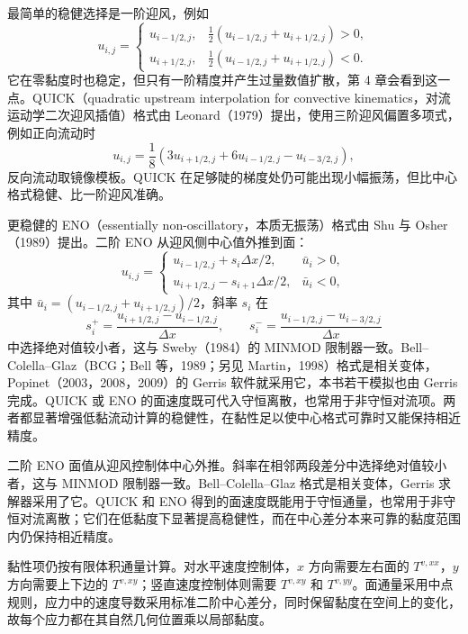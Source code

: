 \documentclass[11pt,a4paper,openany,fontset=none]{ctexbook}
\begin{document}
最简单的稳健选择是一阶迎风，例如
\begin{equation}
 u_{i,j}=\begin{cases}
 u_{i-1/2,j},&\tfrac12(u_{i-1/2,j}+u_{i+1/2,j})>0,\\
 u_{i+1/2,j},&\tfrac12(u_{i-1/2,j}+u_{i+1/2,j})<0.
 \end{cases} \tag{3.34}
\end{equation}
它在零黏度时也稳定，但只有一阶精度并产生过量数值扩散，第 4 章会看到这一点。QUICK（quadratic upstream interpolation for convective kinematics，对流运动学二次迎风插值）格式由 Leonard（1979）提出，使用三阶迎风偏置多项式，例如正向流动时
\begin{equation}
 u_{i,j}=\frac18(3u_{i+1/2,j}+6u_{i-1/2,j}-u_{i-3/2,j}), \tag{3.35}
\end{equation}
反向流动取镜像模板。QUICK 在足够陡的梯度处仍可能出现小幅振荡，但比中心格式稳健、比一阶迎风准确。

更稳健的 ENO（essentially non-oscillatory，本质无振荡）格式由 Shu 与 Osher（1989）提出。二阶 ENO 从迎风侧中心值外推到面：
\begin{equation}
 u_{i,j}=\begin{cases}
 u_{i-1/2,j}+s_i\Delta x/2,&\bar u_i>0,\\
 u_{i+1/2,j}-s_{i+1}\Delta x/2,&\bar u_i<0,
 \end{cases} \tag{3.36}
\end{equation}
其中 $\bar u_i=(u_{i-1/2,j}+u_{i+1/2,j})/2$，斜率 $s_i$ 在
\begin{equation}
 s_i^+=\frac{u_{i+1/2,j}-u_{i-1/2,j}}{\Delta x},\qquad
 s_i^-=\frac{u_{i-1/2,j}-u_{i-3/2,j}}{\Delta x} \tag{3.37}
\end{equation}
中选择绝对值较小者，这与 Sweby（1984）的 MINMOD 限制器一致。Bell--Colella--Glaz（BCG；Bell 等，1989；另见 Martin，1998）格式是相关变体，Popinet（2003，2008，2009）的 Gerris 软件就采用它，本书若干模拟也由 Gerris 完成。QUICK 或 ENO 的面速度既可代入守恒离散，也常用于非守恒对流项。两者都显著增强低黏流动计算的稳健性，在黏性足以使中心格式可靠时又能保持相近精度。

二阶 ENO 面值从迎风控制体中心外推。斜率在相邻两段差分中选择绝对值较小者，这与 MINMOD 限制器一致。Bell--Colella--Glaz 格式是相关变体，Gerris 求解器采用了它。QUICK 和 ENO 得到的面速度既能用于守恒通量，也常用于非守恒对流离散；它们在低黏度下显著提高稳健性，而在中心差分本来可靠的黏度范围内仍保持相近精度。

黏性项仍按有限体积通量计算。对水平速度控制体，$x$ 方向需要左右面的 $T^{v,xx}$，$y$ 方向需要上下边的 $T^{v,xy}$；竖直速度控制体则需要 $T^{v,xy}$ 和 $T^{v,yy}$。面通量采用中点规则，应力中的速度导数采用标准二阶中心差分，同时保留黏度在空间上的变化，故每个应力都在其自然几何位置乘以局部黏度。
\end{document}
